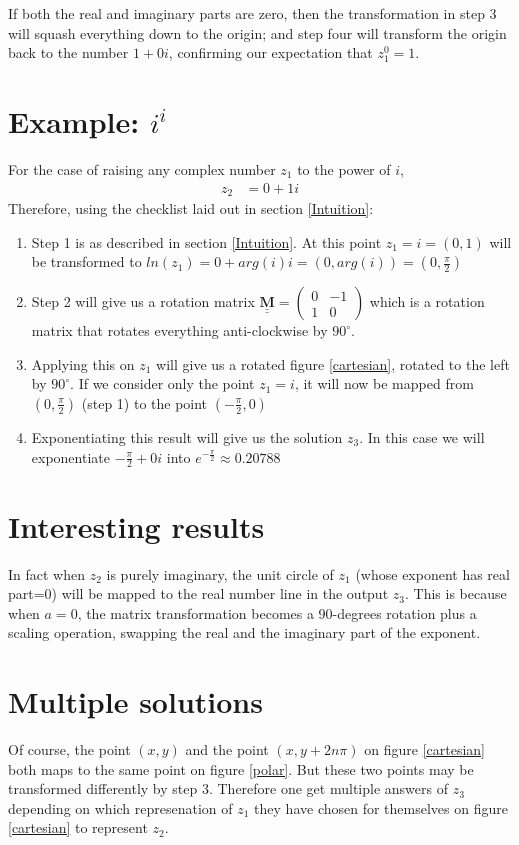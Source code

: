 \documentclass[a4paper, 12pt]{article}
\newcommand{\matr}[1]{\underline{\underline{\textbf{#1}}}}
\begin{document}
If both the real and imaginary parts are zero, then the transformation in step 3 will squash everything down to the origin; and step four will transform the origin back to the number $1+0i$, confirming our expectation that $z_1^0 = 1$.

\section{Example: $i^i$}
For the case of raising any complex number $z_1$ to the power of $i$,
\begin{align}
    z_2 &= 0 + 1i
\end{align}
Therefore, using the checklist laid out in section \ref{Intuition}:

\begin{enumerate}
    \item Step 1 is as described in section \ref{Intuition}. At this point $z_1 = i = (0,1)$ will be transformed to $ln(z_1) = 0+arg(i) i = (0, arg(i)) = (0, \frac{\pi}{2})$
    \item Step 2 will give us a rotation matrix 
$\matr{M} = \begin{pmatrix}
0 & -1\\
1 & 0
\end{pmatrix}$ which is a rotation matrix that rotates everything anti-clockwise by $90 ^\circ$.
    \item Applying this on $z_1$ will give us a rotated figure \ref{cartesian}, rotated to the left by $90^\circ$. If we consider only the point $z_1 = i$, it will now be mapped from $(0, \frac{\pi}{2})$ (step 1) to the point $(-\frac{\pi}{2}, 0)$
    \item Exponentiating this result will give us the solution $z_3$. In this case we will exponentiate $-\frac{\pi}{2} + 0i$ into $e^{-\frac{\pi}{2}} \approx 0.20788$
\end{enumerate}

\section{Interesting results}
In fact when $z_2$ is purely imaginary, the unit circle of $z_1$ (whose exponent has real part=0) will be mapped to the real number line in the output $z_3$. This is because when $a=0$, the matrix transformation becomes a 90-degrees rotation plus a scaling operation, swapping the real and the imaginary part of the exponent.
\section{Multiple solutions}
Of course, the point $(x,y)$ and the point $(x, y + 2n\pi)$ on figure \ref{cartesian} both maps to the same point on figure \ref{polar}. But these two points may be transformed differently by step 3. Therefore one get multiple answers of $z_3$ depending on which represenation of $z_1$ they have chosen for themselves on figure \ref{cartesian} to represent $z_2$.
\end{document}

